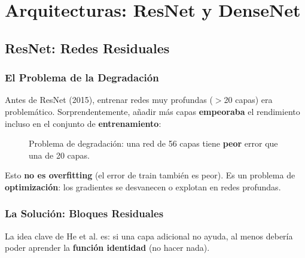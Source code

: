 \documentclass[12pt,a4paper]{article}
\begin{document}
\section{Arquitecturas: ResNet y DenseNet}

\subsection{ResNet: Redes Residuales}

\subsubsection{El Problema de la Degradación}

Antes de ResNet (2015), entrenar redes muy profundas ($>$20 capas) era problemático. Sorprendentemente, añadir más capas \textbf{empeoraba} el rendimiento incluso en el conjunto de \textbf{entrenamiento}:

\begin{figure}[H]
\centering
{}
\caption{Problema de degradación: una red de 56 capas tiene \textbf{peor} error que una de 20 capas.}
\end{figure}

Esto \textbf{no es overfitting} (el error de train también es peor). Es un problema de \textbf{optimización}: los gradientes se desvanecen o explotan en redes profundas.

\subsubsection{La Solución: Bloques Residuales}

La idea clave de He et al. es: si una capa adicional no ayuda, al menos debería poder aprender la \textbf{función identidad} (no hacer nada).
\end{document}
